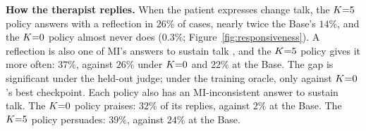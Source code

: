 \textbf{How the therapist replies.}
When the patient expresses change talk, the $K{=}5$ policy answers with a reflection in $26\%$ of
cases, nearly twice the Base's $14\%$, and the $K{=}0$ policy almost never does ($0.3\%$;
Figure~\ref{fig:responsiveness}). A reflection is also one of MI's answers to sustain talk
\citep{miller2013mi}, and the $K{=}5$ policy gives it more often: $37\%$, against $26\%$ under $K{=}0$
and $22\%$ at the Base. The gap is significant under the held-out judge; under the training oracle,
only against $K{=}0$'s best checkpoint. Each policy also has an
MI-inconsistent answer to sustain talk.
The $K{=}0$ policy praises: $32\%$ of its replies, against $2\%$ at the Base. The
$K{=}5$ policy persuades: $39\%$, against $24\%$ at the Base.

